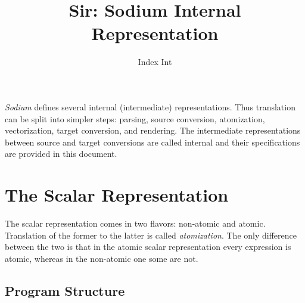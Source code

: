 \documentclass [a4paper] {article}
\title { Sir: Sodium Internal Representation }
\author { Index Int }
\begin{document}
\maketitle

\emph{Sodium} defines several internal (intermediate) representations. Thus
translation can be split into simpler steps: parsing, source conversion,
atomization, vectorization, target conversion, and rendering. The intermediate
representations between source and target conversions are called internal and
their specifications are provided in this document.

\section { The Scalar Representation }

The scalar representation comes in two flavors: non-atomic and atomic.
Translation of the former to the latter is called \emph{atomization}. The only
difference between the two is that in the atomic scalar representation
every expression is atomic, whereas in the non-atomic one some are not.

\subsection { Program Structure }
\end{document}
